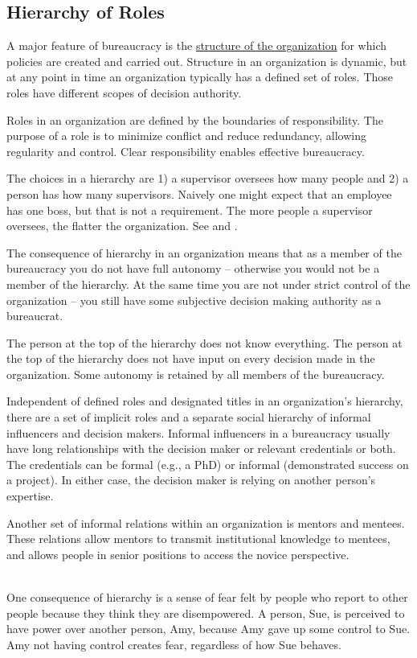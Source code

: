\subsection{Hierarchy of Roles}
A major feature of bureaucracy is the \href{https://en.wikipedia.org/wiki/Organizational_structure}{structure of the organization} for which policies are created and carried out. Structure in an organization is dynamic, but at any point in time an organization typically has a defined set of roles. Those roles have different scopes of decision authority. 

Roles in an organization are defined by the boundaries of responsibility. The purpose of a role is to minimize conflict and reduce redundancy, allowing regularity and control. Clear responsibility enables effective bureaucracy. 

The choices in a hierarchy are 1) a supervisor oversees how many people and 2) a person has how many supervisors. Naively one might expect that an employee has one boss, but that is not a requirement. 
The more people a supervisor oversees, the flatter the organization. See \cite{2012_Valve} and \cite{1972_Joreen}.

The consequence of hierarchy in an organization means that as a member of the bureaucracy you do not have full autonomy -- otherwise you would not be a member of the hierarchy. At the same time you are not under strict control of the organization -- you still have some subjective decision making authority as a bureaucrat.

The person at the top of the hierarchy does not know everything. The person at the top of the hierarchy does not have input on every decision made in the organization. Some autonomy is retained by all members of the bureaucracy.

Independent of defined roles and designated titles in an organization's hierarchy, there are a set of implicit roles and a separate social hierarchy of informal influencers and decision makers. Informal influencers in a bureaucracy usually have long relationships with the decision maker or relevant credentials or both. The credentials can be formal (e.g., a PhD) or informal (demonstrated success on a project). In either case, the decision maker is relying on another person's expertise. 

Another set of informal relations within an organization is mentors and mentees. These relations allow mentors to transmit institutional knowledge to mentees, and allows people in senior positions to access the novice perspective. 


\ \\
One consequence of hierarchy is a sense of fear felt by people who report to other people because they think they are disempowered. A person, Sue, is perceived to have power over another person, Amy, because Amy gave up some control to Sue. Amy not having control creates fear, regardless of how Sue behaves.   

